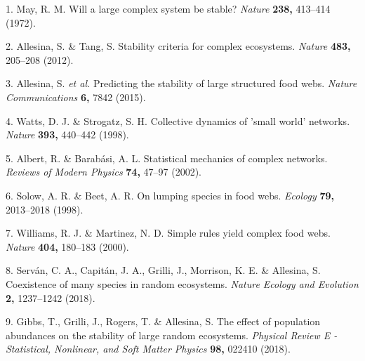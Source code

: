 \documentclass[]{article}
\begin{document}
\hypertarget{refs}{}
\hypertarget{ref-May1972}{}
1. May, R. M. Will a large complex system be stable? \emph{Nature}
\textbf{238,} 413--414 (1972).

\hypertarget{ref-Allesina2012}{}
2. Allesina, S. \& Tang, S. Stability criteria for complex ecosystems.
\emph{Nature} \textbf{483,} 205--208 (2012).

\hypertarget{ref-Allesina2015}{}
3. Allesina, S. \emph{et al.} Predicting the stability of large
structured food webs. \emph{Nature Communications} \textbf{6,} 7842
(2015).

\hypertarget{ref-Watts1998}{}
4. Watts, D. J. \& Strogatz, S. H. Collective dynamics of 'small world'
networks. \emph{Nature} \textbf{393,} 440--442 (1998).

\hypertarget{ref-Albert2002}{}
5. Albert, R. \& Barabási, A. L. Statistical mechanics of complex
networks. \emph{Reviews of Modern Physics} \textbf{74,} 47--97 (2002).

\hypertarget{ref-Solow1998}{}
6. Solow, A. R. \& Beet, A. R. On lumping species in food webs.
\emph{Ecology} \textbf{79,} 2013--2018 (1998).

\hypertarget{ref-Williams2000}{}
7. Williams, R. J. \& Martinez, N. D. Simple rules yield complex food
webs. \emph{Nature} \textbf{404,} 180--183 (2000).

\hypertarget{ref-Servan2018}{}
8. Serván, C. A., Capitán, J. A., Grilli, J., Morrison, K. E. \&
Allesina, S. Coexistence of many species in random ecosystems.
\emph{Nature Ecology and Evolution} \textbf{2,} 1237--1242 (2018).

\hypertarget{ref-Gibbs2017}{}
9. Gibbs, T., Grilli, J., Rogers, T. \& Allesina, S. The effect of
population abundances on the stability of large random ecosystems.
\emph{Physical Review E - Statistical, Nonlinear, and Soft Matter
Physics} \textbf{98,} 022410 (2018).
\end{document}
